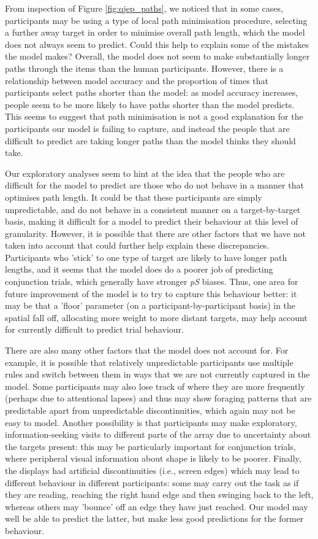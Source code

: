 \documentclass[vision,article,accept,pdftex,moreauthors]{Definitions/mdpi}
\begin{document}
From inspection of Figure \ref{fig:qjep_paths}, we noticed that in some cases, participants may be using a type of local path minimisation procedure, selecting a further away target in order to minimise overall path length, which the model does not always seem to predict. Could this help to explain some of the mistakes the model makes? Overall, the model does not seem to make substantially longer paths through the items than the human participants. However, there is a relationship between model accuracy and the proportion of times that participants select paths shorter than the model: as model accuracy increases, people seem to be more likely to have paths shorter than the model predicts. This seems to suggest that path minimisation is not a good explanation for the participants our model is failing to capture, and instead the people that are difficult to predict are taking longer paths than the model thinks they should take.

Our exploratory analyses seem to hint at the idea that the people who are difficult for the model to predict are those who do not behave in a manner that optimises path length. It could be that these participants are simply unpredictable, and do not behave in a consistent manner on a target-by-target basis, making it difficult for a model to predict their behaviour at this level of granularity. However, it is possible that there are other factors that we have not taken into account that could further help explain these discrepancies. Participants who 'stick' to one type of target are likely to have longer path lengths, and it seems that the model does do a poorer job of predicting conjunction trials, which generally have stronger \textit{pS} biases. Thus, one area for future improvement of the model is to try to capture this behaviour better: it may be that a 'floor' parameter (on a participant-by-participant basis) in the spatial fall off, allocating more weight to more distant targets, may help account for currently difficult to predict trial behaviour.

There are also many other factors that the model does not account for. For example, it is possible that relatively unpredictable participants use multiple rules and switch between them in ways that we are not currently captured in the model. Some participants may also lose track of where they are more frequently (perhaps due to attentional lapses) and thus may show foraging patterns that are predictable apart from unpredictable discontinuities, which again may not be easy to model. Another possibility is that participants may make exploratory, information-seeking visits to different parts of the array due to uncertainty about the targets present: this may be particularly important for conjunction trials, where peripheral visual information about shape is likely to be poorer. Finally, the displays had artificial discontinuities (i.e., screen edges) which may lead to different behaviour in different participants: some may carry out the task as if they are reading, reaching the right hand edge and then swinging back to the left, whereas others may 'bounce' off an edge they have just reached. Our model may well be able to predict the latter, but make less good predictions for the former behaviour.
\end{document}
